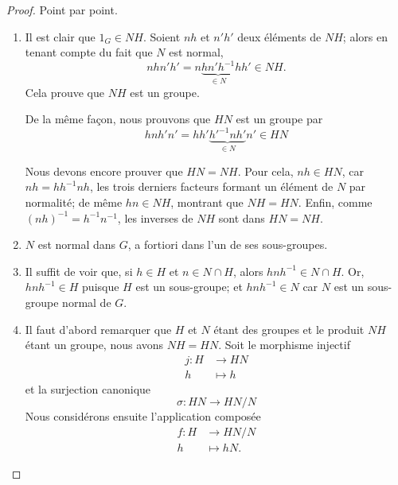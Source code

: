 \begin{proof}
	Point par point.
	\begin{enumerate}
		\item
		      Il est clair que \( 1_G \in NH \). Soient $nh$ et $n'h'$ deux éléments de \( NH \); alors en tenant compte du fait que \( N\) est normal,
		      \begin{equation}
			      nhn'h'=n\underbrace{hn'h^{-1}}_{\in N}hh'\in NH.
		      \end{equation}
		      Cela prouve que \( NH\) est un groupe.

		      De la même façon, nous prouvons que \( HN\) est un groupe par
		      \begin{equation}
			      hnh'n'=hh'\underbrace{h'^{-1}nh'}_{\in N}n'\in HN
		      \end{equation}

		      Nous devons encore prouver que \( HN=NH\). Pour cela, \( nh \in HN \), car \( nh = hh^{-1}nh \), les trois derniers facteurs formant un  élément de \( N \) par normalité; de même \( hn \in NH \), montrant que \( NH = HN \). Enfin, comme \( (nh)^{-1} = h^{-1} n^{-1} \), les inverses de \( NH \) sont dans \( HN = NH \).
		\item
		      \( N\) est normal dans \( G \), a fortiori dans l'un de ses sous-groupes.
		\item
		      Il suffit de voir que, si \( h \in H \) et \( n \in N \cap H \), alors \( hnh^{-1} \in N \cap H \). Or, \( hnh^{-1} \in H \) puisque \( H\) est un sous-groupe; et \( hnh^{-1} \in N \) car \( N \) est un sous-groupe normal de \( G \).
		\item
		      Il faut d'abord remarquer que \( H\) et \( N\) étant des groupes et le produit \( NH\) étant un groupe, nous avons \( NH=HN\). Soit le morphisme injectif
		      \begin{equation}
			      \begin{aligned}
				      j\colon H & \to HN    \\
				      h         & \mapsto h
			      \end{aligned}
		      \end{equation}
		      et la surjection canonique
		      \begin{equation}
			      \sigma\colon HN\to HN/N
		      \end{equation}
		      Nous considérons ensuite l'application composée
		      \begin{equation}
			      \begin{aligned}
				      f\colon H & \to HN/N    \\
				      h         & \mapsto hN.
			      \end{aligned}
		      \end{equation}


\end{enumerate}
\end{proof}
